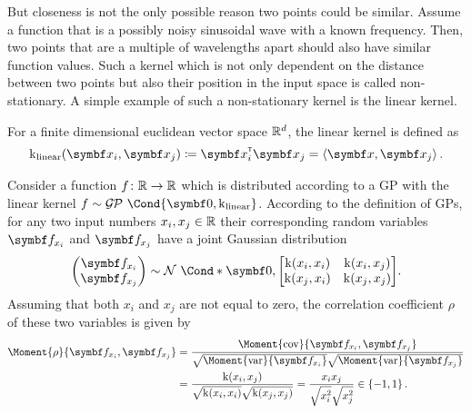 But closeness is not the only possible reason two points could be similar.
Assume a function that is a possibly noisy sinusoidal wave with a known frequency.
Then, two points that are a multiple of wavelengths apart should also have similar function values.
Such a kernel which is not only dependent on the distance between two points but also their position in the input space is called non-stationary.
A simple example of such a non-stationary kernel is the linear kernel.
\begin{definition}
    For a finite dimensional euclidean vector space $\mathbb{R}^d$, the linear kernel is defined as
    \begin{align}
        \K_{\text{linear}}(\mat{x}_i, \mat{x}_j) \coloneqq \mat{x}_i\tran \mat{x}_j = \left\langle \mat{x}, \mat{x}_j\right\rangle.
    \end{align}
\end{definition}
Consider a function $f \colon \mathbb{R} \to \mathbb{R}$ which is distributed according to a GP with the linear kernel $f \sim \GP\Cond{\mat{0}, \K_{\text{linear}}}$.
According to the definition of GPs, for any two input numbers $x_i, x_j \in \mathbb{R}$ their corresponding random variables $\rv{f}_{x_i}$ and $\rv{f}_{x_j}$ have a joint Gaussian distribution
\begin{align}
    \begin{pmatrix}
        \rv{f}_{x_i} \\ \rv{f}_{x_j}
    \end{pmatrix} \sim \Gaussian*{\mat{0}, \begin{bmatrix}
            \K(x_i, x_i) & \K(x_i, x_j) \\
            \K(x_j, x_i) & \K(x_j, x_j)
        \end{bmatrix}}.
\end{align}
Assuming that both $x_i$ and $x_j$ are not equal to zero, the correlation coefficient $\rho$ of these two variables is given by
\begin{equation}
    \begin{split}
        \Moment{\rho}{\rv{f}_{x_i}, \rv{f}_{x_j}}
        &= \frac{\Moment{\cov}{\rv{f}_{x_i}, \rv{f}_{x_j}}}{\sqrt{\Moment{\var}{\rv{f}_{x_i}\vphantom{\rv{f}_{x_j}}}}\sqrt{\Moment{\var}{\rv{f}_{x_j}}}} \\
        &= \frac{\K(x_i, x_j)}{\sqrt{\K(x_i, x_i)} \sqrt{\K(x_j, x_j)}} = \frac{x_ix_j}{\sqrt{\vphantom{x_j^2}x_i^2}\sqrt{\vphantom{x_j^2}x_j^2}} \in \left\{ -1, 1 \right\}.
    \end{split}
\end{equation}
